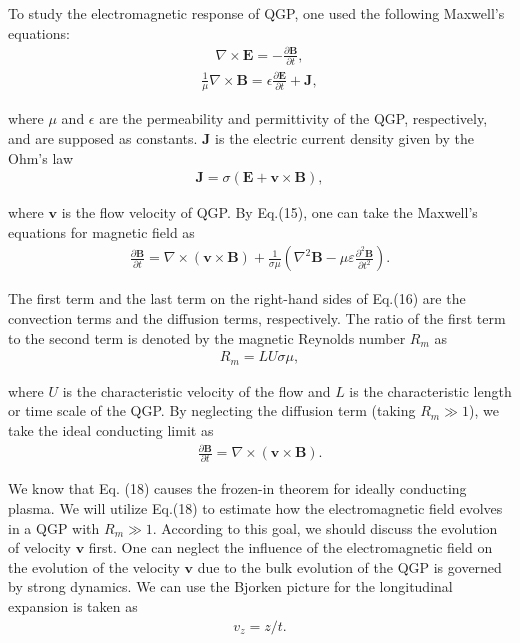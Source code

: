 \documentclass[twocolumn,showpacs,preprintnumbers,amsmath,amssymb]{revtex4}
\begin{document}
To study  the electromagnetic response of
QGP, one used the following Maxwell's equations:
\begin{eqnarray}
\nabla\times\textbf{E}=-\frac{\partial\textbf{B}}{\partial t},
\label{eq:eq13} %
\end{eqnarray}
\begin{eqnarray}
\frac{1}{\mu}\nabla\times\textbf{B}=\epsilon\frac{\partial\textbf{E}}{\partial t} + \textbf{J},
\label{eq:eq14} %
\end{eqnarray}

\noindent where $\mu$ and $\epsilon$ are the permeability and permittivity of the QGP,
respectively, and are supposed as constants. $\textbf{J}$ is the electric
current density given by the Ohm's law
\begin{eqnarray}
\textbf{J}=\sigma(\textbf{E}+\textbf{v}\times\textbf{B}),
\label{eq:eq15} %
\end{eqnarray}

\noindent where $\textbf{v}$ is the flow velocity of QGP.  By Eq.(15), one can take
the Maxwell's equations for magnetic field as
\begin{eqnarray}
\frac{\partial\textbf{B}}{\partial t}=\nabla\times(\textbf{v}\times\textbf{B})+\frac{1}
{\sigma\mu}(\nabla^{2}\textbf{B}-\mu\varepsilon\frac{\partial^{2}\textbf{B}}{\partial t^{2}}).
\label{eq:eq16} %
\end{eqnarray}

The first term and the last term on the right-hand sides of Eq.(16) are the convection terms and  the
diffusion terms, respectively. The ratio of the first term to the second term is denoted by the magnetic Reynolds number $R_{m}$ as
\begin{eqnarray}
R_{m}=LU\sigma\mu,
\label{eq:eq17} %
\end{eqnarray}

\noindent where $U$ is the characteristic velocity of the flow and $L$ is the characteristic length or time scale of the QGP.
By neglecting the diffusion term (taking $R_{m}\gg1$), we take the ideal conducting limit as
\begin{eqnarray}
\frac{\partial\textbf{B}}{\partial t}=\nabla\times (\textbf{v}\times\textbf{B}).
\label{eq:eq18} %
\end{eqnarray}

We know that Eq. (18) causes the frozen-in theorem
for ideally conducting plasma. We will utilize Eq.(18) to estimate how the electromagnetic
field evolves in a QGP with $R_{m}\gg1$. According to this goal, we should discuss the evolution of velocity $\textbf{v}$ first.
One can neglect the influence of the electromagnetic field on
the evolution of the velocity $\textbf{v}$ due to the bulk evolution of the QGP is governed by strong dynamics.
We can use the Bjorken picture for the longitudinal expansion is taken as~\cite{lab27,lab28}
\begin{eqnarray}
v_{z}=z/t.
\label{eq:eq19} %
\end{eqnarray}
\end{document}
